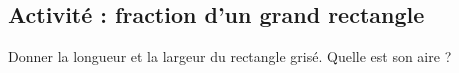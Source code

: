 
\subsection*{Activité : fraction d'un grand rectangle}

Donner la longueur et la largeur du rectangle grisé. Quelle est son aire ?
\begin{center}
   
\end{center}
